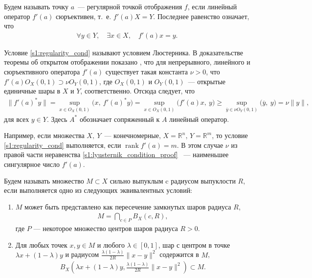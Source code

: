 \documentclass[../main.tex]{subfiles}
\begin{document}
Будем называть точку $a$~--- регулярной точкой отображения $f$, если линейный оператор $f'(a)$ сюръективен, т.~е. $ f'(a) X = Y $.
Последнее равенство означает, что 
\begin{gather}\label{s1:regularity_cond}
 \forall y \in Y, \quad \exists x \in X, \quad f'(a) x = y.
\end{gather}

Условие \eqref{s1:regularity_cond} называют условием Люстерника\cite{Dmitruk1980}.
В доказательстве теоремы об открытом отображении показано \cite[Теорема 2.11, Теорема 4.13]{Rudin}, что для непрерывного, линейного и сюръективного оператора $f'(a)$ существует такая константа $\nu > 0$, что $f'(a) O_X(0, 1) \supset \nu O_Y(0, 1)$, где $ O_X(0, 1)$ и $O_Y(0, 1)$~--- открытые единичные шары в $X$ и $Y$, соответственно.
Отсюда следует, что
\begin{gather}\label{s1:lyusternik_condition_proof}
 \| f'(a)^* y \| = \sup\limits_{x \in O_X(0, 1)} \big(x,\ f'(a)^* y\big) = \sup\limits_{x \in O_X(0, 1)} \big(f'(a) x,\ y\big) \geqslant \sup\limits_{\overline{y} \in \nu O_Y(0, 1)} \big(\overline{y},\ y\big) = \nu \|y\|,
\end{gather}
для всех $y \in Y$.
Здесь $A^*$ обозначает сопряженный к $A$ линейный оператор.
 
Например, если множества $X,\ Y$~--- конечномерные, $X = \mathbb{R}^n$, $Y = \mathbb{R}^m$, то условие \eqref{s1:regularity_cond} выполняется, если $ \operatorname{rank} f'(a) = m$.
В этом случае $\nu$ из правой части неравенства \eqref{s1:lyusternik_condition_proof} ~--- наименьшее сингулярное число $f'(a)$. 

\begin{definition}
		Будем называть множество $M \subset X $ сильно выпуклым c радиусом выпуклости $R$, если выполняется одно из следующих эквивалентных условий:
		\begin{enumerate}
			\item $M$ может быть представлено как пересечение замкнутых шаров радиуса $R$,
			\begin{gather*}
				M = \bigcap\limits_{c \in P} B_X (c, R),
			\end{gather*}
			где $P$ --- некоторое множество центров шаров радиуса $R > 0$.
			\item Для любых точек $x, y \in M$ и любого $\lambda \in [0, 1]$, шар с центром в точке $\lambda x + (1 - \lambda) y $ и радиусом $\frac{\lambda (1 - \lambda)} {2 R} \| x - y \|^2$ содержится в $M$,
			\begin{gather*}
				B_X\left(\lambda x + (1 - \lambda) y, \frac{\lambda (1 - \lambda)} {2 R} \| x - y \|^2\right) \subset M.
			\end{gather*}
		\end{enumerate}
\end{definition}
\end{document}
